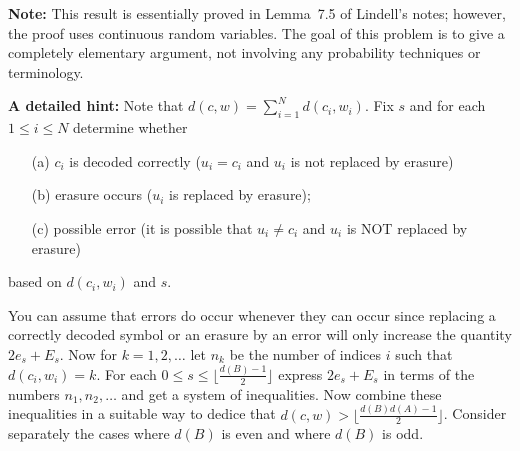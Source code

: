 \documentclass[12pt]{amsart}
\begin{document}
{\bf Note:} This result is essentially proved in Lemma~7.5 of Lindell's notes; however, the proof uses continuous random variables. The goal of this problem is to give a completely elementary argument, not involving any probability techniques or terminology.

\skv
{\bf A detailed hint:} Note that $d(c,w)=\sum\limits_{i=1}^N d(c_i,w_i)$. Fix $s$ and for each $1\leq i\leq N$  determine whether
\begin{itemize}
\item[(a)] $c_i$ is decoded correctly ($u_i=c_i$ and $u_i$ is not replaced by erasure)
\item[(b)] erasure occurs ($u_i$ is replaced by erasure);
\item[(c)] possible error (it is possible that $u_i\neq c_i$ and $u_i$ is NOT replaced by erasure)
\end{itemize}
based on $d(c_i,w_i)$ and $s$.

You can assume that errors do occur whenever they can occur since replacing a correctly decoded symbol or an erasure by an error will only
increase the quantity $2e_s + E_s$. Now for $k=1,2,\ldots$ let $n_k$ be the number of indices $i$ such that $d(c_i,w_i)=k$.
For each $0\leq s\leq \lfloor \frac{d(B)-1}{2}\rfloor$ express $2e_s + E_s$ in terms of the numbers $n_1,n_2,\ldots$
and get a system of inequalities. Now combine these inequalities in a suitable way to dedice that
$d(c,w)> \lfloor\frac{d(B)d(A)-1}{2}\rfloor$. Consider separately the cases where $d(B)$ is even and where $d(B)$ is odd.
\end{document}
